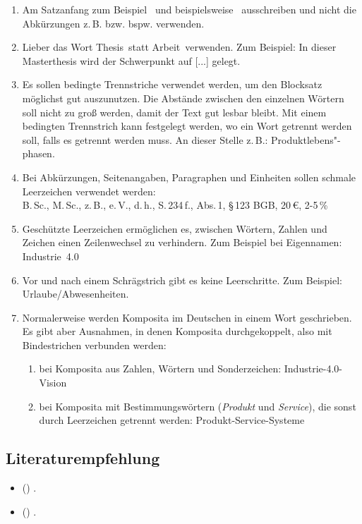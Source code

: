 \begin{enumerate}
    
    \item Am Satzanfang \glqq zum Beispiel\grqq~ und \glqq beispielsweise\grqq~ ausschreiben und nicht die Abkürzungen z.\,B. bzw. bspw. verwenden.
    \item Lieber das Wort \glqq Thesis\grqq~statt \glqq Arbeit\grqq~verwenden. Zum Beispiel: In dieser Masterthesis wird der Schwerpunkt auf [...] gelegt. 
    \item Es sollen bedingte Trennstriche verwendet werden, um den Blocksatz möglichst gut auszunutzen. Die Abstände zwischen den einzelnen Wörtern soll nicht zu groß werden, damit der Text gut lesbar bleibt. Mit einem bedingten Trennstrich kann festgelegt werden, wo ein Wort getrennt werden soll, falls es getrennt werden muss. An dieser Stelle z.\,B.: Produktlebens"-phasen.
    \item Bei Abkürzungen, Seitenangaben, Paragraphen und Einheiten sollen schmale Leerzeichen verwendet werden:\\
     B.\,Sc., M.\,Sc., z.\,B., e.\,V., d.\,h., S.\,234\,f., Abs.\,1, §\,123 BGB, 20\,€, 2-5\,\% 
    \item Geschützte Leerzeichen ermöglichen es, zwischen Wörtern, Zahlen und Zeichen einen Zeilenwechsel zu verhindern. Zum Beispiel bei Eigennamen: Industrie~4.0
    \item Vor und nach einem Schrägstrich gibt es keine Leerschritte. Zum Beispiel: Urlaube/Abwesenheiten.
    \item Normalerweise werden Komposita im Deutschen in einem Wort geschrieben. Es gibt aber Ausnahmen, in denen Komposita durchgekoppelt, also mit Bindestrichen verbunden werden: 
    \begin{enumerate}
        \item bei Komposita aus Zahlen, Wörtern und Sonderzeichen: Industrie-4.0-Vision
        \item bei Komposita mit Bestimmungswörtern (\textit{Produkt} und \textit{Service}), die sonst durch Leerzeichen getrennt werden: Produkt-Service-Systeme
    \end{enumerate}
    
\end{enumerate}

\subsection{Literaturempfehlung}
\begin{itemize}
    \item {} (\citeyear{karmasin2013gestaltung}) \textcite{karmasin2013gestaltung}.
    \item {} (\citeyear{TheisenWissenschaftlichesArbeiten2021}) \textcite{TheisenWissenschaftlichesArbeiten2021}.
\end{itemize}

